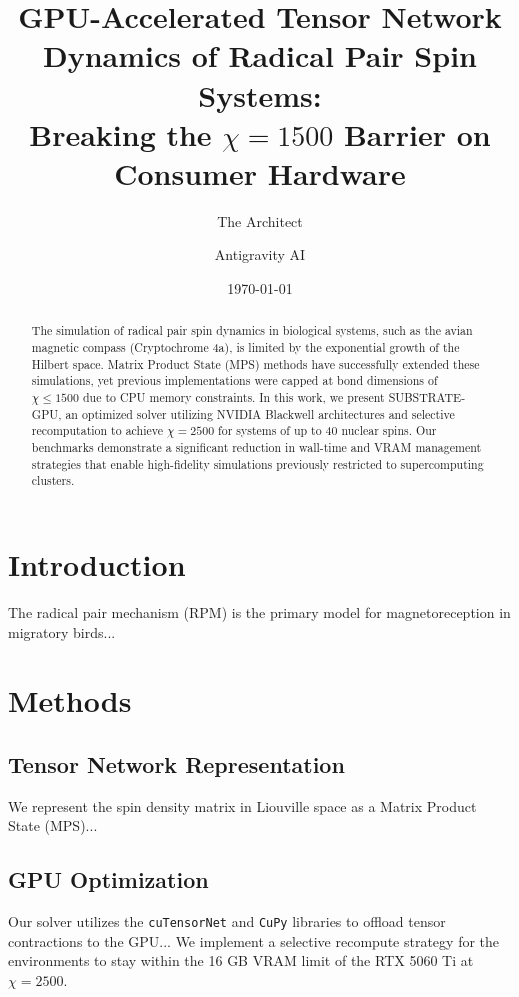 \documentclass[reprint,aps,prb,superscriptaddress]{revtex4-2}
\begin{document}
\title{GPU-Accelerated Tensor Network Dynamics of Radical Pair Spin Systems: \\ 
Breaking the $\chi=1500$ Barrier on Consumer Hardware}

\author{The Architect}

\author{Antigravity AI}

\date{\today}

\begin{abstract}
The simulation of radical pair spin dynamics in biological systems, such as the avian magnetic compass (Cryptochrome 4a), 
is limited by the exponential growth of the Hilbert space. Matrix Product State (MPS) methods have successfully 
extended these simulations, yet previous implementations were capped at bond dimensions of $\chi \le 1500$ due 
to CPU memory constraints. In this work, we present SUBSTRATE-GPU, an optimized solver utilizing NVIDIA Blackwell 
architectures and selective recomputation to achieve $\chi=2500$ for systems of up to 40 nuclear spins. 
Our benchmarks demonstrate a significant reduction in wall-time and VRAM management strategies that enable 
high-fidelity simulations previously restricted to supercomputing clusters.
\end{abstract}

\maketitle

\section{Introduction}
The radical pair mechanism (RPM) is the primary model for magnetoreception in migratory birds...

\section{Methods}
\subsection{Tensor Network Representation}
We represent the spin density matrix in Liouville space as a Matrix Product State (MPS)...

\subsection{GPU Optimization}
Our solver utilizes the \texttt{cuTensorNet} and \texttt{CuPy} libraries to offload tensor contractions 
to the GPU... We implement a selective recompute strategy for the environments to stay within 
the 16 GB VRAM limit of the RTX 5060 Ti at $\chi=2500$.
\end{document}
